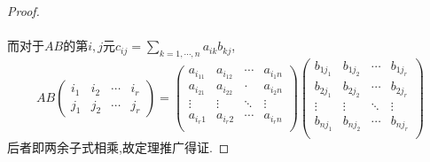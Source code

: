 \documentclass[UTF8,a4paper,notitlepage]{book}
\begin{document}
\begin{proof}
            \paragraph{}而对于$AB$的第$i,j$元$c_{ij}=\sum\limits_{k=1,\cdots,n}a_{ik}b_{kj}$,
            $$AB\begin{pmatrix}i_1 & i_2 & \cdots & i_r \\ j_1 & j_2 & \cdots & j_r\end{pmatrix}=
                \begin{pmatrix}
                    a_{i_11}&a_{i_12}&\cdots&a_{i_1n}\\ 
                    a_{i_21}&a_{i_22}&\cdot&a_{i_2n}\\ 
                    \vdots&\vdots&\ddots&\vdots\\ 
                    a_{i_r1}&a_{i_r2}&\cdots&a_{i_rn}\\ 
                \end{pmatrix}
                \begin{pmatrix}
                    b_{1j_1}&b_{1j_2}&\cdots&b_{1j_r}\\ 
                    b_{2j_1}&b_{2j_2}&\cdots&b_{2j_r}\\ 
                    \vdots&\vdots&\ddots&\vdots\\ 
                    b_{nj_1}&b_{nj_2}&\cdots&b_{nj_r}\\ 
                \end{pmatrix}$$
            后者即两余子式相乘,故定理推广得证.
        \end{proof}
\end{document}
